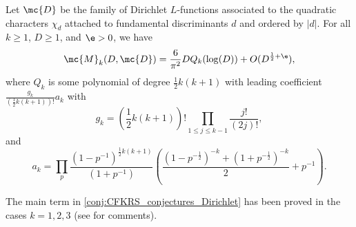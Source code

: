   \begin{conjecture}\label{conj:CFKRS_conjectures_Dirichlet}
    Let $\mc{D}$ be the family of Dirichlet $L$-functions associated to the quadratic characters $\chi_{d}$ attached to fundamental discriminants $d$ and ordered by $|d|$. For all $k \ge 1$, $D \ge 1$, and $\e > 0$, we have
    \[
      \mc{M}_{k}(D,\mc{D}) = \frac{6}{\pi^{2}}DQ_{k}(\log(D))+O(D^{\frac{1}{2}+\e}),
    \]
    where $Q_{k}$ is some polynomial of degree $\frac{1}{2}k(k+1)$ with leading coefficient $\frac{g_{k}}{\left(\frac{1}{2}k(k+1)\right)!}a_{k}$ with
    \[
      g_{k} = \left(\frac{1}{2}k(k+1)\right)!\prod_{1 \le j \le k-1}\frac{j!}{(2j)!},
    \]
    and
    \[
      a_{k} = \prod_{p}\frac{(1-p^{-1})^{\frac{1}{2}k(k+1)}}{(1+p^{-1})}\left(\frac{(1-p^{-\frac{1}{2}})^{-k}+(1+p^{-\frac{1}{2}})^{-k}}{2}+p^{-1}\right).
    \]
  \end{conjecture}

  The main term in \cref{conj:CFKRS_conjectures_Dirichlet} has been proved in the cases $k = 1,2,3$ (see \cite{conrey2005integral} for comments).